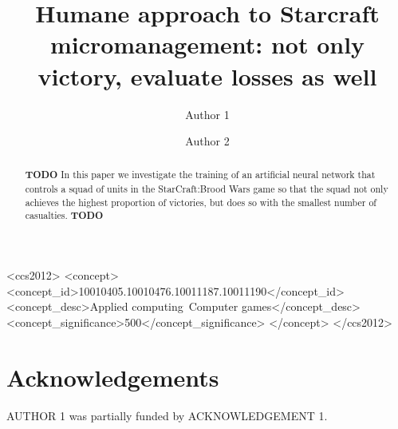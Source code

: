 \documentclass[sigconf, authordraft]{acmart}
\begin{document}
\title{Humane approach to Starcraft micromanagement: not only victory, evaluate losses as well}

\author{Author 1}

\author{Author 2}

\begin{abstract}
  {\bf TODO} In this paper we investigate the training of an
  artificial neural network that controls a squad of units in the
  StarCraft:Brood Wars game so that the squad not only achieves the
  highest proportion of victories, but does so with the smallest
  number of casualties. {\bf TODO}
\end{abstract}

\begin{CCSXML}
<ccs2012>
<concept>
<concept_id>10010405.10010476.10011187.10011190</concept_id>
<concept_desc>Applied computing~Computer games</concept_desc>
<concept_significance>500</concept_significance>
</concept>
</ccs2012>
\end{CCSXML}



\maketitle















\section*{Acknowledgements}

AUTHOR 1 was partially funded by ACKNOWLEDGEMENT 1.


{}
\end{document}
